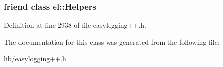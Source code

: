 \subsubsection[{el\+::\+Helpers}]{\setlength{\rightskip}{0pt plus 5cm}friend class {\bf el\+::\+Helpers}\hspace{0.3cm}{\ttfamily [friend]}}\label{classel_1_1base_1_1_typed_configurations_a2fb8a2c02cbf86247f093c118bed877a}


Definition at line 2938 of file easylogging++.\+h.



The documentation for this class was generated from the following file\+:\begin{DoxyCompactItemize}
\item 
lib/\hyperlink{easylogging_09_09_8h}{easylogging++.\+h}\end{DoxyCompactItemize}

